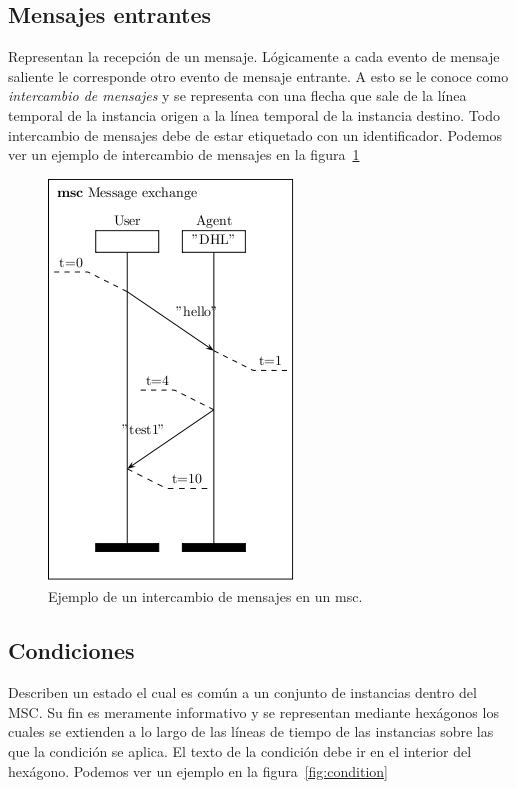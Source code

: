 \subsection*{Mensajes entrantes}
Representan la recepción de un mensaje. Lógicamente a cada evento de
mensaje saliente le corresponde otro evento de mensaje entrante. A
esto se le conoce como \textit{intercambio de mensajes} y se representa con una
flecha que sale de la línea temporal de la instancia origen a la
línea temporal de la instancia destino. Todo intercambio de mensajes
debe de estar etiquetado con un identificador. Podemos ver un ejemplo
de intercambio de mensajes en la figura~\ref{fig:message_exchange}

\begin{figure}
  \centering
  \includegraphics[scale=1]{./images/message exchange.png}
  \caption{Ejemplo de un intercambio de mensajes en un msc.}
  \label{fig:message_exchange}
\end{figure}

\subsection*{Condiciones}
Describen un estado el cual es común a un conjunto de instancias
dentro del MSC. Su fin es meramente informativo y se representan
mediante hexágonos los cuales se extienden a lo largo de las líneas de
tiempo de las instancias sobre las que la condición se aplica. El
texto de la condición debe ir en el interior del hexágono. Podemos ver
un ejemplo en la figura~\ref{fig:condition}

